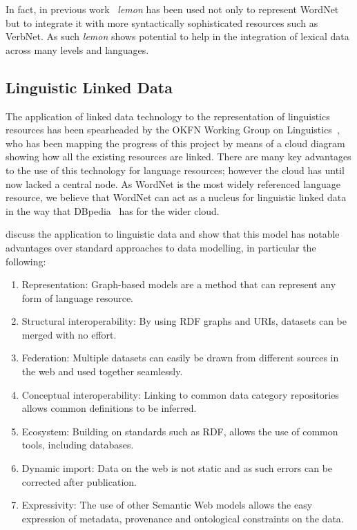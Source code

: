 \documentclass[10pt, a4paper]{article}
\newcommand{\lemon}[0]{\emph{lemon}}
\begin{document}
In fact, in previous work~\cite{eckle2014lemonuby} \lemon{} has been used not only to
represent WordNet but to integrate it with more syntactically sophisticated
resources such as VerbNet. As such \lemon{} shows potential to help in the
integration of lexical data across many levels and languages.

\subsection{Linguistic Linked Data}

The application of linked data technology to the representation of linguistics
resources has been spearheaded by the OKFN Working Group on Linguistics~\cite{chiarcos2011towards},
who has been mapping the progress of this project by means of a cloud
diagram showing how all the existing resources are linked. 
There are many key advantages to the use
of this technology for language resources; however the cloud has until now
lacked a central node. As WordNet is the most widely referenced language
resource, we believe that WordNet can act as a nucleus for linguistic linked data
in the way that DBpedia~\cite{auer2007dbpedia} has for the wider cloud.

\cite{chiarcos2013towards} discuss the
application to linguistic data and show that this model has notable
advantages over standard approaches to data modelling, in particular the following:

\begin{enumerate}
    \item Representation: Graph-based models are a method that can represent any
        form of language resource.
    \item Structural interoperability: By using RDF graphs and URIs, datasets can
        be merged with no effort.
    \item Federation: Multiple datasets can easily be drawn from different
        sources in the web and used together seamlessly.
    \item Conceptual interoperability: Linking to common data category
        repositories allows common definitions to be inferred.
    \item Ecosystem: Building on standards such as RDF, allows the use of common
        tools, including databases.
    \item Dynamic import: Data on the web is not static and as such errors can
        be corrected after publication.
    \item Expressivity: The use of other Semantic Web models allows the easy
        expression of metadata, provenance and ontological constraints on the
        data.
\end{enumerate}
\end{document}
